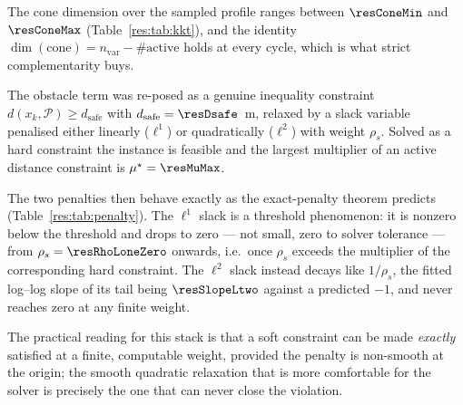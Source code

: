 The cone dimension over the sampled profile ranges between $\resConeMin$ and $\resConeMax$ (Table~\ref{res:tab:kkt}), and the identity $\dim(\text{cone}) = n_{\text{var}} - \#\text{active}$ holds at every cycle, which is what strict complementarity buys.

\begin{table}[htbp]
  \centering
  \small
  \caption{Optimality diagnostics at sampled cycles of the recorded run \resBag. ``active'' counts equalities and active bounds together; ``rank'' is the rank of the Jacobian of the active constraints, so LICQ holds when the two coincide.}
  \label{res:tab:kkt}
\end{table}

\label{res:penalty}


The obstacle term was re-posed as a genuine inequality constraint $d(x_k,\mathcal{P})\ge d_{\mathrm{safe}}$ with $d_{\mathrm{safe}}=\resDsafe$~m, relaxed by a slack variable penalised either linearly ($\ell^1$) or quadratically ($\ell^2$) with weight $\rho_s$. Solved as a hard constraint the instance is feasible and the largest multiplier of an active distance constraint is $\mu^\star=\resMuMax$.

The two penalties then behave exactly as the exact-penalty theorem predicts (Table~\ref{res:tab:penalty}). The $\ell^1$ slack is a threshold phenomenon: it is nonzero below the threshold and drops to zero --- not small, zero to solver tolerance --- from $\rho_s=\resRhoLoneZero$ onwards, i.e.\ once $\rho_s$ exceeds the multiplier of the corresponding hard constraint. The $\ell^2$ slack instead decays like $1/\rho_s$, the fitted log--log slope of its tail being $\resSlopeLtwo$ against a predicted $-1$, and never reaches zero at any finite weight.

The practical reading for this stack is that a soft constraint can be made \emph{exactly} satisfied at a finite, computable weight, provided the penalty is non-smooth at the origin; the smooth quadratic relaxation that is more comfortable for the solver is precisely the one that can never close the violation.

